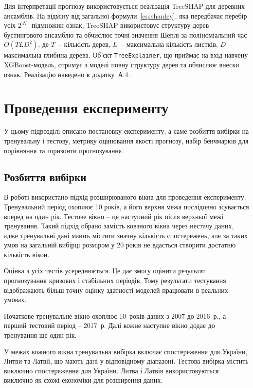 \documentclass{bachelor_thesis}
\begin{document}
Для інтерпретації прогнозу використовується реалізація TreeSHAP для деревних ансамблів. На відміну від загальної формули~\eqref{eq:shapley}, яка передбачає перебір усіх $2^{|N|}$~підмножин ознак, TreeSHAP використовує структуру дерев бустингового ансамблю та обчислює точні значення Шеплі за поліноміальний час $O(TLD^2)$, де $T$~-- кількість дерев, $L$~-- максимальна кількість листків, $D$~-- максимальна глибина дерева. Об'єкт \texttt{TreeExplainer}, що приймає на вхід навчену XGBoost-модель, отримує з моделі повну структуру дерев та обчислює внески ознак. Реалізацію наведено в додатку~А.4.

\section{Проведення експерименту}

У цьому підрозділі описано постановку експерименту, а саме розбиття вибірки на тренувальну і тестову, метрику оцінювання якості прогнозу, набір бенчмарків для порівняння та горизонти прогнозування.

\subsection{Розбиття вибірки}

В роботі використано підхід розширюваного вікна для проведення експерименту. Тренувальний період охоплює 10 років, а його верхня межа послідовно зсувається вперед на один рік. Тестове вікно -- це наступний рік після верхньої межі тренування. Такий підхід обрано замість ковзного вікна через нестачу даних, адже тренувальні дані мають містити значну кількість спостережень, але за таких умов на загальній вибірці розміром у 20 років не вдасться створити достатню кількість вікон.

Оцінка з усіх тестів усереднюється. Це дає змогу оцінити результат прогнозування кризових і стабільних періодів. Тому результати тестування відображають більш точну оцінку здатності моделей працювати в реальних умовах.

Початкове тренувальне вікно охоплює 10~років даних з 2007 до 2016~р., а перший тестовий період -- 2017~р. Далі кожне наступне вікно додає до тренування ще один рік.

У межах кожного вікна тренувальна вибірка включає спостереження для України, Литви та Латвії, що мають дані у відповідному діапазоні. Тестова вибірка містить виключно спостереження для України. Литва і Латвія використовуються виключно як схожі економіки для розширення даних.
\end{document}
